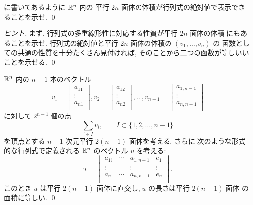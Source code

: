 \documentclass[12pt,twoside]{jarticle}
\begin{document}

\begin{question}
  \label{q:|det|=Vol}
   に書いてあるように ${\mathbb R}^n$ 内の
  平行 $2n$ 面体の体積が行列式の絶対値で表示できることを示せ. \qed
\end{question}

\begin{proof}[ヒント]
  まず, 行列式の多重線形性に対応する性質が平行 $2n$ 面体の体積
  にもあることを示せ.  
  行列式の絶対値と平行 $2n$ 面体の体積の $(v_1,\ldots,v_n)$ の
  函数としての共通の性質を十分たくさん見付ければ,
  そのことから二つの函数が等しいいことを示せる.
  \qed
\end{proof}


\begin{question}
  \label{q:|det|=vecArea2}
  ${\mathbb R}^n$ 内の $n-1$ 本のベクトル
  \begin{equation*}
    v_1=
    \begin{bmatrix}
      a_{11} \\
      \vdots \\
      a_{n1} \\
    \end{bmatrix},
    v_2=
    \begin{bmatrix}
      a_{12} \\
      \vdots \\
      a_{n2} \\
    \end{bmatrix},
    \ldots,
    v_{n-1}=
    \begin{bmatrix}
      a_{1,n-1} \\
      \vdots \\
      a_{n,n-1} \\
    \end{bmatrix}
  \end{equation*}
  に対して $2^{n-1}$ 個の点
  \begin{equation*}
    \sum_{i\in I} v_i, \qquad I\subset\{1,2,\ldots,n-1\}
  \end{equation*}
  を頂点とする $n-1$ 次元平行 $2(n-1)$ 面体を考える. さらに
  次のような形式的な行列式で定義される ${\mathbb R}^n$ のベクトル $u$ を考える:
  \begin{equation*}
    u =
    \begin{vmatrix}
      a_{11} & \cdots & a_{1,n-1} & e_1 \\
      \vdots &        & \vdots    & \vdots \\
      a_{n1} & \cdots & a_{n,n-1} & e_n \\
    \end{vmatrix}.
  \end{equation*}
  このとき $u$ は平行 $2(n-1)$ 面体に直交し, $u$ の長さは平行 $2(n-1)$ 面体
  の面積に等しい. 
  \qed
\end{question}
\end{document}
